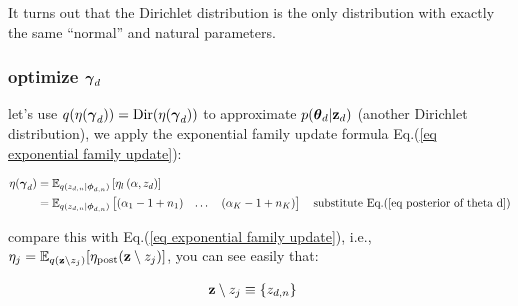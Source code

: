 \documentclass{article}
\def\post{\text{post}}
\begin{document}
It turns out that the Dirichlet distribution is the only distribution with exactly the same ``normal'' and natural parameters.



\subsubsection{optimize $\boldsymbol{\gamma}_d$}

let's use $q(\eta(\boldsymbol{\gamma}_d)) = \text{Dir}(\eta(\boldsymbol{\gamma}_d))$ to approximate $p( \boldsymbol{\theta}_d | {\mathbf z}_{d} ) $ (another Dirichlet distribution), we apply the exponential family update formula Eq.(\ref{eq exponential family update}):

\begin{equation}\begin{split}
\eta(\boldsymbol{\gamma}_d) &= \mathbb{E}_{q(z_{d,n} | \boldsymbol{\phi}_{d,n} )} \left[ \eta_l \left(\alpha,  z_{d} \right) \right]\\
&= \mathbb{E}_{q(z_{d,n} | \boldsymbol{\phi}_{d,n} )}   \begin{bmatrix}(\alpha_1 - 1 + n_1) & \dots & (\alpha_K - 1 + n_K)  \end{bmatrix}\quad\text{substitute Eq.(\ref{eq posterior of theta d})}\\
\end{split}\end{equation}

compare this with Eq.(\ref{eq exponential family update}), i.e., $\eta_j =  \E_{q(\z \setminus z_j )} [\eta_\post (\z \setminus z_j )]$, you can see easily that: 

\begin{equation}\begin{split}
{\mathbf z} \setminus z_j &\equiv \{ z_{d,n} \}
\end{split}\end{equation}
\end{document}
